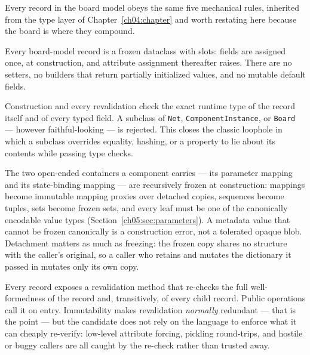 Every record in the board model obeys the same five mechanical rules,
inherited from the type layer of Chapter~\ref{ch04:chapter} and worth
restating here because the board is where they compound.

\begin{ruleenv}\label{ch05:rule:frozen}
Every board-model record is a frozen dataclass with slots: fields are
assigned once, at construction, and attribute assignment thereafter raises.
There are no setters, no builders that return partially initialized
values, and no mutable default fields.
\end{ruleenv}

\begin{ruleenv}\label{ch05:rule:exact}
Construction and every revalidation check the exact runtime type of the
record itself and of every typed field. A subclass of \texttt{Net},
\texttt{ComponentInstance}, or \texttt{Board} --- however
faithful-looking --- is rejected. This closes the classic loophole in
which a subclass overrides equality, hashing, or a property to lie about
its contents while passing type checks.
\end{ruleenv}

\begin{ruleenv}
\label{ch05:rule:freeze}
The two open-ended containers a component carries --- its parameter
mapping and its state-binding mapping --- are recursively frozen at
construction: mappings become immutable mapping proxies over detached
copies, sequences become tuples, sets become frozen sets, and every leaf
must be one of the canonically encodable value types
(Section~\ref{ch05:sec:parameters}). A metadata value that cannot be
frozen canonically is a construction error, not a tolerated opaque blob.
Detachment matters as much as freezing: the frozen copy shares no
structure with the caller's original, so a caller who retains and mutates
the dictionary it passed in mutates only its own copy.
\end{ruleenv}

\begin{ruleenv}\label{ch05:rule:revalidate}
Every record exposes a revalidation method that re-checks the full
well-formedness of the record and, transitively, of every child record.
Public operations call it on entry. Immutability makes revalidation
\emph{normally} redundant --- that is the point --- but the candidate does
not rely on the language to enforce what it can cheaply re-verify:
low-level attribute forcing, pickling round-trips, and hostile or buggy
callers are all caught by the re-check rather than trusted away.
\end{ruleenv}


